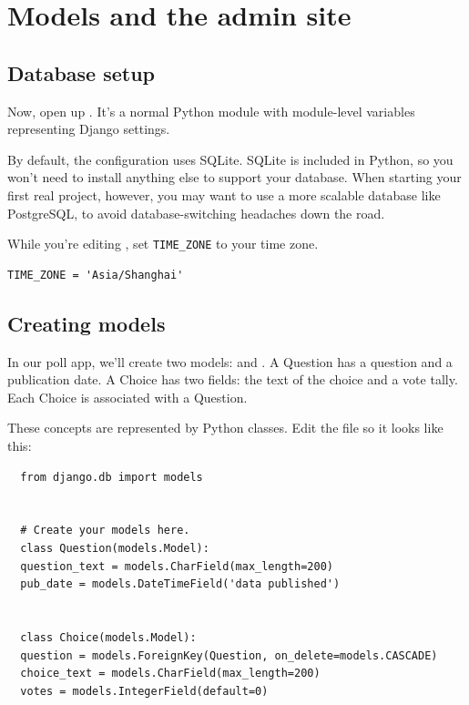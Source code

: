 
\chapter{Models and the admin site}

\section{Database setup}

Now, open up . It’s a normal Python module with module-level variables representing Django settings.

By default, the configuration uses SQLite.
SQLite is included in Python, so you won’t need to install anything else to support your database.
When starting your first real project, however, you may want to use a more scalable database like PostgreSQL, to avoid database-switching headaches down the road.


While you’re editing , set \verb|TIME_ZONE| to your time zone.
\begin{tcolorbox}
\begin{verbatim}
TIME_ZONE = 'Asia/Shanghai'
\end{verbatim}
  
\end{tcolorbox}



\section{Creating models}

In our poll app, we’ll create two models:  and .
A Question has a question and a publication date.
A Choice has two fields: the text of the choice and a vote tally.
Each Choice is associated with a Question.


These concepts are represented by Python classes.
Edit the  file so it looks like this:
\lstset{language=Python}
\begin{lstlisting}
  from django.db import models


  # Create your models here.
  class Question(models.Model):
  question_text = models.CharField(max_length=200)
  pub_date = models.DateTimeField('data published')


  class Choice(models.Model):
  question = models.ForeignKey(Question, on_delete=models.CASCADE)
  choice_text = models.CharField(max_length=200)
  votes = models.IntegerField(default=0)

\end{lstlisting}


